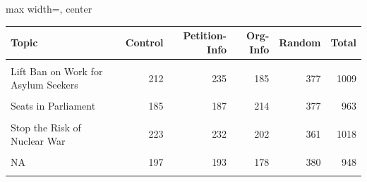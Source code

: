 \renewcommand{\arraystretch}{1.2}
\begin{adjustbox}{max width=\linewidth, center}
\begingroup\fontsize{10}{12}\selectfont

\begin{tabular}{lrrrrr}
\toprule
\textbf{Topic} & \textbf{Control} & \textbf{Petition-Info} & \textbf{Org-Info} & \textbf{Random} & \textbf{Total}\\
\midrule
\cellcolor{gray!15}{End Suffering for Mother Pigs} & \cellcolor{gray!15}{217} & \cellcolor{gray!15}{203} & \cellcolor{gray!15}{205} & \cellcolor{gray!15}{420} & \cellcolor{gray!15}{1045}\\
Lift Ban on Work for Asylum Seekers & 212 & 235 & 185 & 377 & 1009\\
\cellcolor{gray!15}{Oppose Facial Recognition} & \cellcolor{gray!15}{224} & \cellcolor{gray!15}{211} & \cellcolor{gray!15}{218} & \cellcolor{gray!15}{383} & \cellcolor{gray!15}{1036}\\
Seats in Parliament & 185 & 187 & 214 & 377 & 963\\
\cellcolor{gray!15}{Stop Banks Fuelling Climate Crisis} & \cellcolor{gray!15}{205} & \cellcolor{gray!15}{195} & \cellcolor{gray!15}{195} & \cellcolor{gray!15}{369} & \cellcolor{gray!15}{964}\\
Stop the Risk of Nuclear War & 223 & 232 & 202 & 361 & 1018\\
\cellcolor{gray!15}{Urge Govts to Protect Trees} & \cellcolor{gray!15}{221} & \cellcolor{gray!15}{191} & \cellcolor{gray!15}{225} & \cellcolor{gray!15}{380} & \cellcolor{gray!15}{1017}\\
NA & 197 & 193 & 178 & 380 & 948\\
\textbf{\cellcolor{gray!15}{Total}} & \textbf{\cellcolor{gray!15}{1684}} & \textbf{\cellcolor{gray!15}{1647}} & \textbf{\cellcolor{gray!15}{1622}} & \textbf{\cellcolor{gray!15}{3047}} & \textbf{\cellcolor{gray!15}{NA}}\\
\bottomrule
\end{tabular}
\endgroup{}

\end{adjustbox}

